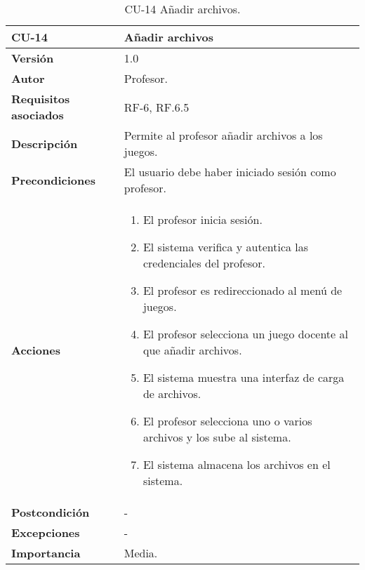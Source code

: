 \begin{table}[h!]
	\centering
	\begin{tabularx}{\linewidth}{ p{} p{} }
		\toprule
		\textbf{CU-14}    & \textbf{Añadir archivos}\\
		\toprule
		\textbf{Versión}              & 1.0    \\
		\textbf{Autor}                & Profesor. \\
		\textbf{Requisitos asociados} & RF-6, RF.6.5 \\
		\textbf{Descripción}          & Permite al profesor añadir archivos a los juegos.\\
		\textbf{Precondiciones}         & El usuario debe haber iniciado sesión como profesor. \\
		\textbf{Acciones}             &
		\begin{enumerate}
			\def\labelenumi{\arabic{enumi}.}
			\tightlist
			\item El profesor inicia sesión.
            \item El sistema verifica y autentica las credenciales del profesor.
            \item El profesor es redireccionado al menú de juegos.
    	\item El profesor selecciona un juego docente al que añadir archivos.
            \item El sistema muestra una interfaz de carga de archivos.
    	\item El profesor selecciona uno o varios archivos y los sube al sistema.
    	\item El sistema almacena los archivos en el sistema.
		\end{enumerate}\\
         \textbf{Postcondición}             & - \\
		\textbf{Excepciones}             & - \\
		\textbf{Importancia}          & Media. \\
		\bottomrule
	\end{tabularx}
	\caption{CU-14 Añadir archivos.}
\end{table}

